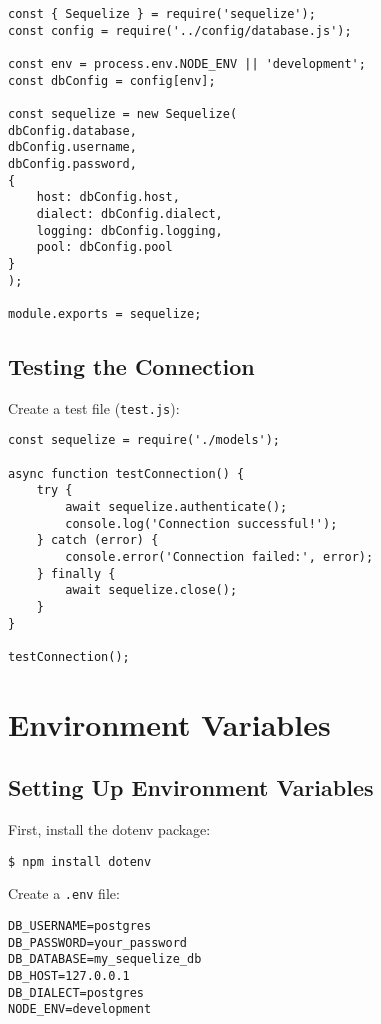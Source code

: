 \documentclass[12pt,a4paper]{book}
\begin{document}
	\begin{verbatim}
const { Sequelize } = require('sequelize');
const config = require('../config/database.js');

const env = process.env.NODE_ENV || 'development';
const dbConfig = config[env];

const sequelize = new Sequelize(
dbConfig.database,
dbConfig.username,
dbConfig.password,
{
	host: dbConfig.host,
	dialect: dbConfig.dialect,
	logging: dbConfig.logging,
	pool: dbConfig.pool
}
);

module.exports = sequelize;
	\end{verbatim}
	
	\subsection{Testing the Connection}
	Create a test file (\texttt{test.js}):
	
	\begin{verbatim}
const sequelize = require('./models');

async function testConnection() {
	try {
		await sequelize.authenticate();
		console.log('Connection successful!');
	} catch (error) {
		console.error('Connection failed:', error);
	} finally {
		await sequelize.close();
	}
}

testConnection();
	\end{verbatim}
	
	\section{Environment Variables}
	
	\subsection{Setting Up Environment Variables}
	First, install the dotenv package:
	
	\begin{verbatim}
$ npm install dotenv
	\end{verbatim}
	
	Create a \texttt{.env} file:
	
	\begin{verbatim}
DB_USERNAME=postgres
DB_PASSWORD=your_password
DB_DATABASE=my_sequelize_db
DB_HOST=127.0.0.1
DB_DIALECT=postgres
NODE_ENV=development
	\end{verbatim}
	
\end{document}
